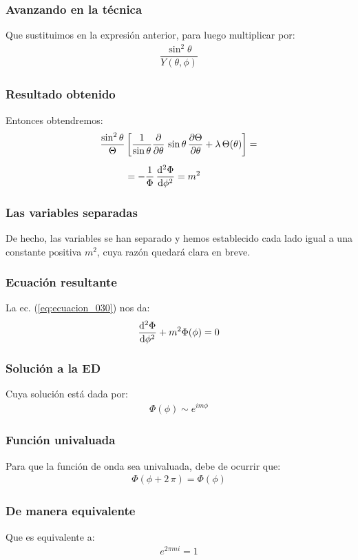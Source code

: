 \documentclass[12pt]{beamer}
\begin{document}
\begin{frame}
\frametitle{Avanzando en la técnica}
Que sustituimos en la expresión anterior, para luego multiplicar por:
\pause
\begin{align*}
\dfrac{\sin^{2} \theta}{Y(\theta, \phi)}
\end{align*}
\end{frame}
\begin{frame}
\frametitle{Resultado obtenido}
Entonces obtendremos:
\pause
\begin{align}
\begin{aligned}
\dfrac{\sin^{2} \theta}{\Theta} &\left[ \dfrac{1}{\sin \theta} \pdv{\theta} \, \sin \theta \, \pdv{\Theta}{\theta} + \lambda \, \Theta (\theta) \right] = \\[0.5em]
&= - \dfrac{1}{\Phi} \, \dv[2]{\Phi}{\phi} = m^{2}
\end{aligned}
\label{eq:ecuacion_030}
\end{align}
\end{frame}
\begin{frame}
\frametitle{Las variables separadas}
De hecho, las variables se han separado y hemos establecido cada lado igual a una constante positiva $m^{2}$, cuya razón quedará clara en breve.
\end{frame}
\begin{frame}
\frametitle{Ecuación resultante}
La ec. (\ref{eq:ecuacion_030}) nos da:
\pause
\begin{align*}
\dv[2]{\Phi}{\phi} + m^{2} \Phi (\phi) = 0
\end{align*}
\end{frame}
\begin{frame}
\frametitle{Solución a la ED}
Cuya solución está dada por:
\pause
\begin{align*}
\Phi(\phi) \sim e^{i m \phi}
\end{align*}
\end{frame}
\begin{frame}
\frametitle{Función univaluada}
Para que la función de onda sea univaluada, debe de ocurrir que:
\pause
\begin{align}
\Phi(\phi +  2 \, \pi) = \Phi(\phi)
\label{eq:ecuacion_031}
\end{align}
\end{frame}
\begin{frame}
\frametitle{De manera equivalente}
Que es equivalente a:
\pause
\begin{align*}
e^{2 \pi m i} = 1
\end{align*}
\end{frame}
\end{document}

